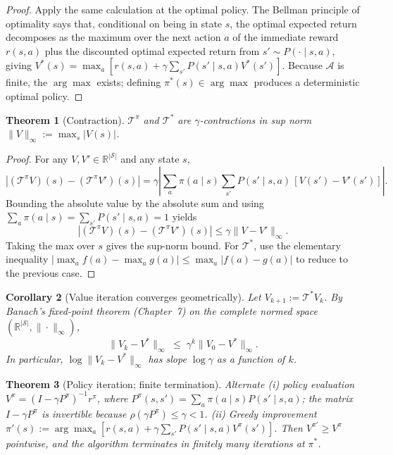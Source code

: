 \documentclass[11pt]{article}
\newtheorem{theorem}{Theorem}[section]
\newtheorem{corollary}[theorem]{Corollary}
\theoremstyle{remark}
\begin{document}
\begin{proof}
Apply the same calculation at the optimal policy. The Bellman principle of optimality says that, conditional on being in state $s$, the optimal expected return decomposes as the maximum over the next action $a$ of the immediate reward $r(s,a)$ plus the discounted optimal expected return from $s' \sim P(\cdot\mid s,a)$, giving $V^*(s) = \max_a [r(s,a) + \gamma\sum_{s'} P(s'\mid s,a) V^*(s')]$. Because $\mathcal{A}$ is finite, the $\arg\max$ exists; defining $\pi^*(s)\in\arg\max$ produces a deterministic optimal policy.
\end{proof}

\begin{theorem}[Contraction]
$\mathcal{T}^\pi$ and $\mathcal{T}^*$ are $\gamma$-contractions in sup norm $\|V\|_\infty := \max_s |V(s)|$.
\end{theorem}

\begin{proof}
For any $V, V' \in \mathbb{R}^{|\mathcal{S}|}$ and any state $s$,
\[
|(\mathcal{T}^\pi V)(s) - (\mathcal{T}^\pi V')(s)|
= \gamma\left| \sum_a \pi(a\mid s) \sum_{s'} P(s'\mid s,a)\, [V(s')-V'(s')] \right|.
\]
Bounding the absolute value by the absolute sum and using $\sum_a \pi(a\mid s) = \sum_{s'} P(s'\mid s,a) = 1$ yields
\[
|(\mathcal{T}^\pi V)(s) - (\mathcal{T}^\pi V')(s)| \le \gamma \|V - V'\|_\infty.
\]
Taking the max over $s$ gives the sup-norm bound. For $\mathcal{T}^*$, use the elementary inequality $|\max_a f(a) - \max_a g(a)| \le \max_a |f(a) - g(a)|$ to reduce to the previous case.
\end{proof}

\begin{corollary}[Value iteration converges geometrically]
Let $V_{k+1} := \mathcal{T}^* V_k$. By Banach's fixed-point theorem (Chapter~7) on the complete normed space $(\mathbb{R}^{|\mathcal{S}|},\|\cdot\|_\infty)$,
\[
\|V_k - V^*\|_\infty \;\le\; \gamma^k \|V_0 - V^*\|_\infty.
\]
In particular, $\log\|V_k - V^*\|_\infty$ has slope $\log \gamma$ as a function of $k$.
\end{corollary}

\begin{theorem}[Policy iteration; finite termination]
Alternate (i) policy evaluation $V^\pi = (I - \gamma P^\pi)^{-1} r^\pi$, where $P^\pi(s,s') = \sum_a \pi(a\mid s)P(s'\mid s,a)$; the matrix $I - \gamma P^\pi$ is invertible because $\rho(\gamma P^\pi)\le \gamma <1$. (ii) Greedy improvement $\pi'(s) := \arg\max_a [r(s,a) + \gamma \sum_{s'} P(s'\mid s,a) V^\pi(s')]$. Then $V^{\pi'}\ge V^\pi$ pointwise, and the algorithm terminates in finitely many iterations at $\pi^*$.
\end{theorem}
\end{document}
